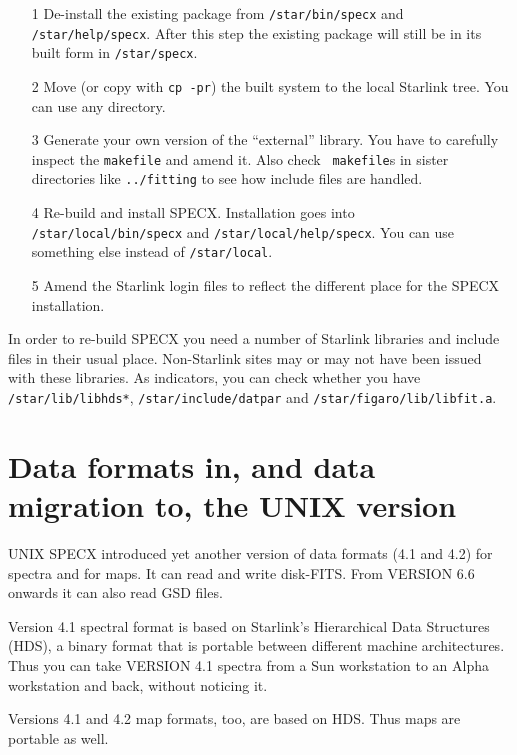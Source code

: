 \documentclass[twoside,11pt]{article}
\newcommand{\xref}[3]{#1}
\newcommand{\xlabel}[1]{}
\renewcommand{\_}{\texttt{\symbol{95}}}
\begin{document}
\begin{itemize}
\item[1] De-install the existing package from {\tt /star/bin/specx} and
   {\tt /star/help/specx}. After this step the existing package will
   still be in its built form in {\tt /star/specx}.
\item[2] Move (or copy with {\tt cp -pr}) the built system to the local
   Starlink tree. You can use any directory.
\item[3] Generate your own version of the ``external'' library. You have
   to carefully inspect the {\tt makefile} and amend it. Also check {\tt
   makefile}s in sister directories like {\tt ../fitting} to see how
   include files are handled.
\item[4] Re-build and install SPECX. Installation goes into {\tt
   /star/local/bin/specx} and {\tt /star/\-local/help/specx}. You can use
   something else instead of {\tt /star/local}.
\item[5] Amend the Starlink login files to reflect the different place
   for the SPECX installation.
\end{itemize}

In order to re-build SPECX you need a number of Starlink libraries and
include files in their usual place. Non-Starlink sites may or may not
have been issued with these libraries. As indicators, you can check
whether you have {\tt /star/lib/libhds*}, {\tt /star/include/dat\_par}
and {\tt /star/figaro/lib/libfit.a}.


\section{\xlabel{data_formats_in_and_data_migration_to_the_unix_version}Data 
formats in, and data migration to, the UNIX version}

UNIX SPECX introduced yet another version of data formats (4.1 and 4.2) for
spectra and for maps. It can read and write disk-FITS. From VERSION 6.6
onwards it can also read \xref{GSD}{sun229}{} files.

Version 4.1 spectral format is based on Starlink's Hierarchical Data
Structures (HDS), a binary format that is portable between different
machine architectures. Thus you can take VERSION 4.1 spectra from a Sun
workstation to an Alpha workstation and back, without noticing it.

Versions 4.1 and 4.2 map formats, too, are based on HDS. Thus maps are
portable as well.
\end{document}
